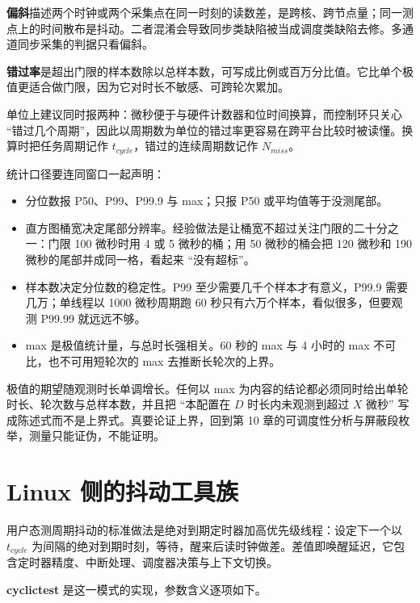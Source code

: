 \documentclass[12pt,a4paper,fontset=fandol]{ctexbook}
\begin{document}
\textbf{偏斜}描述两个时钟或两个采集点在同一时刻的读数差，是跨核、跨节点量；同一测点上的时间散布是抖动。二者混淆会导致同步类缺陷被当成调度类缺陷去修。多通道同步采集的判据只看偏斜。

\textbf{错过率}是超出门限的样本数除以总样本数，可写成比例或百万分比值。它比单个极值更适合做门限，因为它对时长不敏感、可跨轮次累加。

单位上建议同时报两种：微秒便于与硬件计数器和位时间换算，而控制环只关心 ``错过几个周期''，因此以周期数为单位的错过率更容易在跨平台比较时被读懂。换算时把任务周期记作 $t_{cycle}$，错过的连续周期数记作 $N_{miss}$。

统计口径要连同窗口一起声明：

\begin{itemize}
  \item 分位数报 P50、P99、P99.9 与 max；只报 P50 或平均值等于没测尾部。
  \item 直方图桶宽决定尾部分辨率。经验做法是让桶宽不超过关注门限的二十分之一：门限 100 微秒时用 4 或 5 微秒的桶；用 50 微秒的桶会把 120 微秒和 190 微秒的尾部并成同一格，看起来 ``没有超标''。
  \item 样本数决定分位数的稳定性。P99 至少需要几千个样本才有意义，P99.9 需要几万；单线程以 1000 微秒周期跑 60 秒只有六万个样本，看似很多，但要观测 P99.99 就远远不够。
  \item max 是极值统计量，与总时长强相关。60 秒的 max 与 4 小时的 max 不可比，也不可用短轮次的 max 去推断长轮次的上界。
\end{itemize}

\begin{warning}[title={用短轮次的 max 声明 ``最大抖动为 80 微秒''}]
极值的期望随观测时长单调增长。任何以 max 为内容的结论都必须同时给出单轮时长、轮次数与总样本数，并且把 ``本配置在 $D$ 时长内未观测到超过 $X$ 微秒'' 写成陈述式而不是上界式。真要论证上界，回到第 10 章的可调度性分析与屏蔽段枚举，测量只能证伪，不能证明。
\end{warning}

\section{Linux 侧的抖动工具族}

用户态测周期抖动的标准做法是绝对到期定时器加高优先级线程：设定下一个以 $t_{cycle}$ 为间隔的绝对到期时刻，等待，醒来后读时钟做差。差值即唤醒延迟，它包含定时器精度、中断处理、调度器决策与上下文切换。

\textbf{cyclictest} 是这一模式的实现，参数含义逐项如下。
\end{document}
